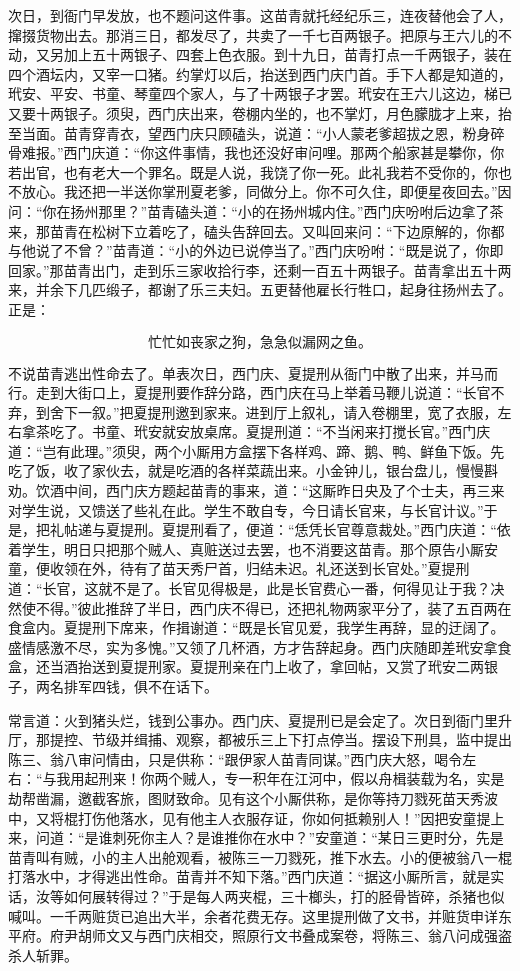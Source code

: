 次日，到衙门早发放，也不题问这件事。这苗青就托经纪乐三，连夜替他会了人，撺掇货物出去。那消三日，都发尽了，共卖了一千七百两银子。把原与王六儿的不动，又另加上五十两银子、四套上色衣服。到十九日，苗青打点一千两银子，装在四个酒坛内，又宰一口猪。约掌灯以后，抬送到西门庆门首。手下人都是知道的，玳安、平安、书童、琴童四个家人，与了十两银子才罢。玳安在王六儿这边，梯已又要十两银子。须臾，西门庆出来，卷棚内坐的，也不掌灯，月色朦胧才上来，抬至当面。苗青穿青衣，望西门庆只顾磕头，说道：“小人蒙老爹超拔之恩，粉身碎骨难报。”西门庆道：“你这件事情，我也还没好审问哩。那两个船家甚是攀你，你若出官，也有老大一个罪名。既是人说，我饶了你一死。此礼我若不受你的，你也不放心。我还把一半送你掌刑夏老爹，同做分上。你不可久住，即便星夜回去。”因问：“你在扬州那里？”苗青磕头道：“小的在扬州城内住。”西门庆吩咐后边拿了茶来，那苗青在松树下立着吃了，磕头告辞回去。又叫回来问：“下边原解的，你都与他说了不曾？”苗青道：“小的外边已说停当了。”西门庆吩咐：“既是说了，你即回家。”那苗青出门，走到乐三家收拾行李，还剩一百五十两银子。苗青拿出五十两来，并余下几匹缎子，都谢了乐三夫妇。五更替他雇长行牲口，起身往扬州去了。正是：

\[
忙忙如丧家之狗，急急似漏网之鱼。
\]

不说苗青逃出性命去了。单表次日，西门庆、夏提刑从衙门中散了出来，并马而行。走到大街口上，夏提刑要作辞分路，西门庆在马上举着马鞭儿说道：“长官不弃，到舍下一叙。”把夏提刑邀到家来。进到厅上叙礼，请入卷棚里，宽了衣服，左右拿茶吃了。书童、玳安就安放桌席。夏提刑道：“不当闲来打搅长官。”西门庆道：“岂有此理。”须臾，两个小厮用方盒摆下各样鸡、蹄、鹅、鸭、鲜鱼下饭。先吃了饭，收了家伙去，就是吃酒的各样菜蔬出来。小金钟儿，银台盘儿，慢慢斟劝。饮酒中间，西门庆方题起苗青的事来，道：“这厮昨日央及了个士夫，再三来对学生说，又馈送了些礼在此。学生不敢自专，今日请长官来，与长官计议。”于是，把礼帖递与夏提刑。夏提刑看了，便道：“恁凭长官尊意裁处。”西门庆道：“依着学生，明日只把那个贼人、真赃送过去罢，也不消要这苗青。那个原告小厮安童，便收领在外，待有了苗天秀尸首，归结未迟。礼还送到长官处。”夏提刑道：“长官，这就不是了。长官见得极是，此是长官费心一番，何得见让于我？决然使不得。”彼此推辞了半日，西门庆不得已，还把礼物两家平分了，装了五百两在食盒内。夏提刑下席来，作揖谢道：“既是长官见爱，我学生再辞，显的迂阔了。盛情感激不尽，实为多愧。”又领了几杯酒，方才告辞起身。西门庆随即差玳安拿食盒，还当酒抬送到夏提刑家。夏提刑亲在门上收了，拿回帖，又赏了玳安二两银子，两名排军四钱，俱不在话下。

常言道：火到猪头烂，钱到公事办。西门庆、夏提刑已是会定了。次日到衙门里升厅，那提控、节级并缉捕、观察，都被乐三上下打点停当。摆设下刑具，监中提出陈三、翁八审问情由，只是供称：“跟伊家人苗青同谋。”西门庆大怒，喝令左右：“与我用起刑来！你两个贼人，专一积年在江河中，假以舟楫装载为名，实是劫帮凿漏，邀截客旅，图财致命。见有这个小厮供称，是你等持刀戮死苗天秀波中，又将棍打伤他落水，见有他主人衣服存证，你如何抵赖别人！”因把安童提上来，问道：“是谁刺死你主人？是谁推你在水中？”安童道：“某日三更时分，先是苗青叫有贼，小的主人出舱观看，被陈三一刀戮死，推下水去。小的便被翁八一棍打落水中，才得逃出性命。苗青并不知下落。”西门庆道：“据这小厮所言，就是实话，汝等如何展转得过？”于是每人两夹棍，三十榔头，打的胫骨皆碎，杀猪也似喊叫。一千两赃货已追出大半，余者花费无存。这里提刑做了文书，并赃货申详东平府。府尹胡师文又与西门庆相交，照原行文书叠成案卷，将陈三、翁八问成强盗杀人斩罪。

